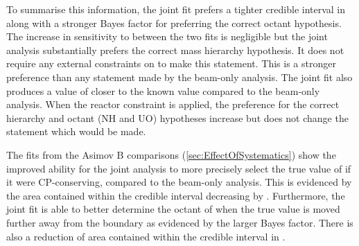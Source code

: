 To summarise this information, the joint fit prefers a tighter \quickmath{1\sigma} credible interval in  along with a stronger Bayes factor for preferring the correct octant hypothesis. The increase in sensitivity to  between the two fits is negligible but the joint analysis substantially prefers the correct mass hierarchy hypothesis. It does not require any external constraints on  to make this statement. This is a stronger preference than any statement made by the beam-only analysis. The joint fit also produces a value of  closer to the known value compared to the beam-only analysis. When the reactor constraint is applied, the preference for the correct hierarchy and octant (NH and UO) hypotheses increase but does not change the statement which would be made.

The fits from the Asimov B comparisons (\autoref{sec:EffectOfSystematics}) show the improved ability for the joint analysis to more precisely select the true value of  if it were CP-conserving, compared to the beam-only analysis. This is evidenced by the area contained within the \quickmath{1\sigma} credible interval decreasing by . Furthermore, the joint fit is able to better determine the octant of  when the true value is moved further away from the boundary as evidenced by the larger Bayes factor. There is also a  reduction of area contained within the \quickmath{1\sigma} credible interval in .
